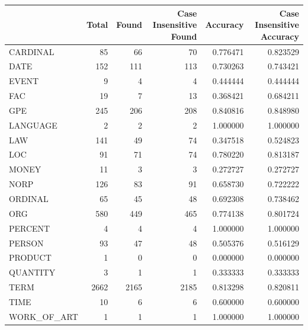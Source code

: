 \begin{tabular}{lrrrrr}
\toprule
 & Total & Found & Case Insensitive Found & Accuracy & Case Insensitive Accuracy \\
\midrule
CARDINAL & 85 & 66 & 70 & 0.776471 & 0.823529 \\
DATE & 152 & 111 & 113 & 0.730263 & 0.743421 \\
EVENT & 9 & 4 & 4 & 0.444444 & 0.444444 \\
FAC & 19 & 7 & 13 & 0.368421 & 0.684211 \\
GPE & 245 & 206 & 208 & 0.840816 & 0.848980 \\
LANGUAGE & 2 & 2 & 2 & 1.000000 & 1.000000 \\
LAW & 141 & 49 & 74 & 0.347518 & 0.524823 \\
LOC & 91 & 71 & 74 & 0.780220 & 0.813187 \\
MONEY & 11 & 3 & 3 & 0.272727 & 0.272727 \\
NORP & 126 & 83 & 91 & 0.658730 & 0.722222 \\
ORDINAL & 65 & 45 & 48 & 0.692308 & 0.738462 \\
ORG & 580 & 449 & 465 & 0.774138 & 0.801724 \\
PERCENT & 4 & 4 & 4 & 1.000000 & 1.000000 \\
PERSON & 93 & 47 & 48 & 0.505376 & 0.516129 \\
PRODUCT & 1 & 0 & 0 & 0.000000 & 0.000000 \\
QUANTITY & 3 & 1 & 1 & 0.333333 & 0.333333 \\
TERM & 2662 & 2165 & 2185 & 0.813298 & 0.820811 \\
TIME & 10 & 6 & 6 & 0.600000 & 0.600000 \\
WORK_OF_ART & 1 & 1 & 1 & 1.000000 & 1.000000 \\
\bottomrule
\end{tabular}
